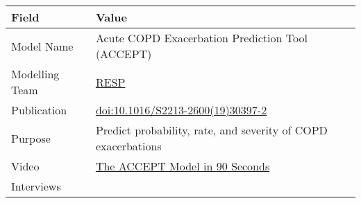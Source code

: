 \documentclass[
]{book}
\begin{document}
\begin{longtable}[]{@{}ll@{}}
\toprule
\begin{minipage}[b]{0.45\columnwidth}\raggedright
Field\strut
\end{minipage} & \begin{minipage}[b]{0.49\columnwidth}\raggedright
Value\strut
\end{minipage}\tabularnewline
\midrule
\endhead
\begin{minipage}[t]{0.45\columnwidth}\raggedright
Model Name\strut
\end{minipage} & \begin{minipage}[t]{0.49\columnwidth}\raggedright
Acute COPD Exacerbation Prediction Tool (ACCEPT)\strut
\end{minipage}\tabularnewline
\begin{minipage}[t]{0.45\columnwidth}\raggedright
Modelling Team\strut
\end{minipage} & \begin{minipage}[t]{0.49\columnwidth}\raggedright
\href{http://resp.core.ubc.ca}{RESP}\strut
\end{minipage}\tabularnewline
\begin{minipage}[t]{0.45\columnwidth}\raggedright
Publication\strut
\end{minipage} & \begin{minipage}[t]{0.49\columnwidth}\raggedright
\href{https://doi.org/10.1016/S2213-2600(19)30397-2}{doi:10.1016/S2213-2600(19)30397-2}\strut
\end{minipage}\tabularnewline
\begin{minipage}[t]{0.45\columnwidth}\raggedright
Purpose\strut
\end{minipage} & \begin{minipage}[t]{0.49\columnwidth}\raggedright
Predict probability, rate, and severity of COPD exacerbations\strut
\end{minipage}\tabularnewline
\begin{minipage}[t]{0.45\columnwidth}\raggedright
Video\strut
\end{minipage} & \begin{minipage}[t]{0.49\columnwidth}\raggedright
\href{https://www.peermodelsnetwork.com/educational-videos?wix-vod-video-id=679cbb410686401193779a2931731c56\&wix-vod-comp-id=comp-k8q9lys1}{The ACCEPT Model in 90 Seconds}\strut
\end{minipage}\tabularnewline
\begin{minipage}[t]{0.45\columnwidth}\raggedright
Interviews\strut
\end{minipage} & \begin{minipage}[t]{0.49\columnwidth}\raggedright

\end{minipage}
\end{longtable}
\end{document}
